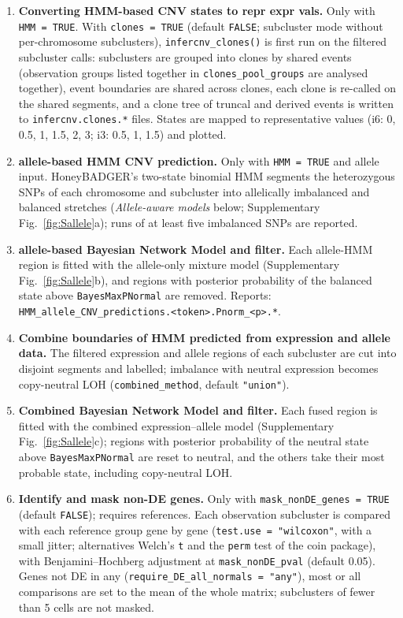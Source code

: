 \begin{enumerate}
\item[\textbf{22}] \textbf{Converting HMM-based CNV states to repr expr vals.} Only with \texttt{HMM\ =\ TRUE}. With \texttt{clones\ =\ TRUE} (default \texttt{FALSE}; subcluster mode without per-chromosome subclusters), \texttt{infercnv\_clones()} is first run on the filtered subcluster calls: subclusters are grouped into clones by shared events (observation groups listed together in \texttt{clones\_pool\_groups} are analysed together), event boundaries are shared across clones, each clone is re-called on the shared segments, and a clone tree of truncal and derived events is written to \texttt{infercnv.clones.*} files. States are mapped to representative values (i6: 0, 0.5, 1, 1.5, 2, 3; i3: 0.5, 1, 1.5) and plotted.

\item[\textbf{23}] \textbf{allele-based HMM CNV prediction.} Only with \texttt{HMM\ =\ TRUE} and allele input. HoneyBADGER's two-state binomial HMM segments the heterozygous SNPs of each chromosome and subcluster into allelically imbalanced and balanced stretches (\emph{Allele-aware models} below; Supplementary Fig.~\ref{fig:Sallele}a); runs of at least five imbalanced SNPs are reported.

\item[\textbf{24--25}] \textbf{allele-based Bayesian Network Model and filter.} Each allele-HMM region is fitted with the allele-only mixture model (Supplementary Fig.~\ref{fig:Sallele}b), and regions with posterior probability of the balanced state above \texttt{BayesMaxPNormal} are removed. Reports: \texttt{HMM\_allele\_CNV\_predictions.<token>.Pnorm\_<p>.*}.

\item[\textbf{26}] \textbf{Combine boundaries of HMM predicted from expression and allele data.} The filtered expression and allele regions of each subcluster are cut into disjoint segments and labelled; imbalance with neutral expression becomes copy-neutral LOH (\texttt{combined\_method}, default \texttt{"union"}).

\item[\textbf{27--28}] \textbf{Combined Bayesian Network Model and filter.} Each fused region is fitted with the combined expression--allele model (Supplementary Fig.~\ref{fig:Sallele}c); regions with posterior probability of the neutral state above \texttt{BayesMaxPNormal} are reset to neutral, and the others take their most probable state, including copy-neutral LOH.

\item[\textbf{29}] \textbf{Identify and mask non-DE genes.} Only with \texttt{mask\_nonDE\_genes\ =\ TRUE} (default \texttt{FALSE}); requires references. Each observation subcluster is compared with each reference group gene by gene (\texttt{test.use\ =\ "wilcoxon"}, with a small jitter; alternatives Welch's \texttt{t} and the \texttt{perm} test of the coin package), with Benjamini--Hochberg adjustment at \texttt{mask\_nonDE\_pval} (default 0.05). Genes not DE in any (\texttt{require\_DE\_all\_normals\ =\ "any"}), most or all comparisons are set to the mean of the whole matrix; subclusters of fewer than 5 cells are not masked.


\end{enumerate}
